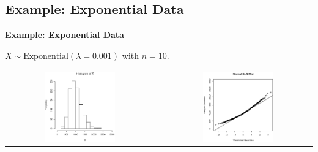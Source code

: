 \documentclass[compress]{beamer}        %
\makeatletter
\newcommand{\tcb}{\textcolor{beamer@blendedblue}}
\makeatother
\begin{document}
\subsection{Example: Exponential Data}
\begin{frame}{\bf \tcb{Example: Exponential Data}}

$X \sim \text{Exponential}(\lambda=0.001)$ with $\boxed{n=10}$.

\begin{adjustwidth}{-0.2cm}{}
\begin{tabular}{c@{}c@{}c}
\includegraphics[width=0.5\textwidth, trim = 0.0cm 0.5cm 0.3cm 0.5cm, clip]{ExpHist10}
&&
\includegraphics[width=0.5\textwidth, trim = 0.0cm 0.5cm 0.3cm 0.5cm, clip]{ExpNorm10}
\end{tabular}
\end{adjustwidth}

\end{frame}
\end{document}
